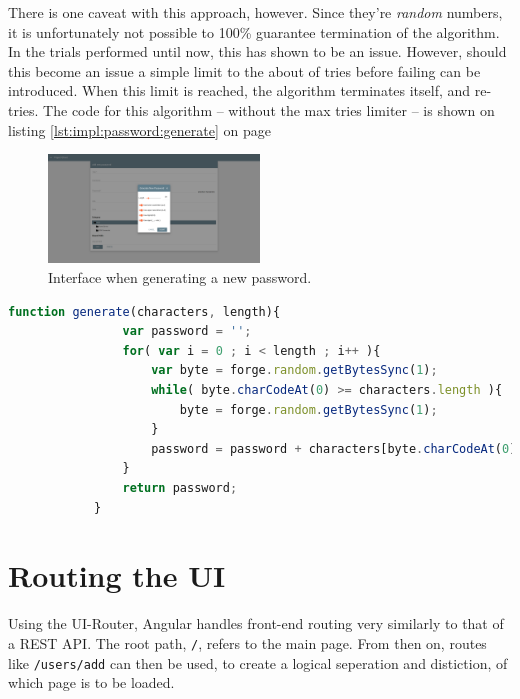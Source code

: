 		There is one caveat with this approach, however. Since they're \emph{random} numbers, it is unfortunately not possible to 100\% guarantee termination of the algorithm. In the trials performed until now, this has shown to be an issue. However, should this become an issue a simple limit to the about of tries before failing can be introduced. When this limit is reached, the algorithm terminates itself, and re-tries. The code for this algorithm -- without the max tries limiter -- is shown on listing \ref{lst:impl:password:generate} on page \pageref{lst:impl:password:generate}


		\begin{figure}[!htb]
			\centering
			\includegraphics[width=0.5\textwidth,clip,trim=750 250 750 250]{figures/implementation/screenshots/add-password.png}
			\caption{Interface when generating a new password.}
			\label{fig:impl:password:generate}
		\end{figure}

		\begin{lstlisting}[language=Javascript,gobble=12,caption={Generating the password, using the value cut-off method},label={lst:impl:password:generate}]
            function generate(characters, length){
                var password = '';
                for( var i = 0 ; i < length ; i++ ){
                    var byte = forge.random.getBytesSync(1);
                    while( byte.charCodeAt(0) >= characters.length ){
                        byte = forge.random.getBytesSync(1);					
                    }
                    password = password + characters[byte.charCodeAt(0)];
                } 
                return password;
            }	
		\end{lstlisting}

	\section{Routing the UI}
		\label{sec:impl:ui-router}
		Using the UI-Router, Angular handles front-end routing very similarly to that of a REST API. The root path, \verb=/=, refers to the main page. From then on, routes like \verb=/users/add= can then be used, to create a logical seperation and distiction, of which page is to be loaded.

